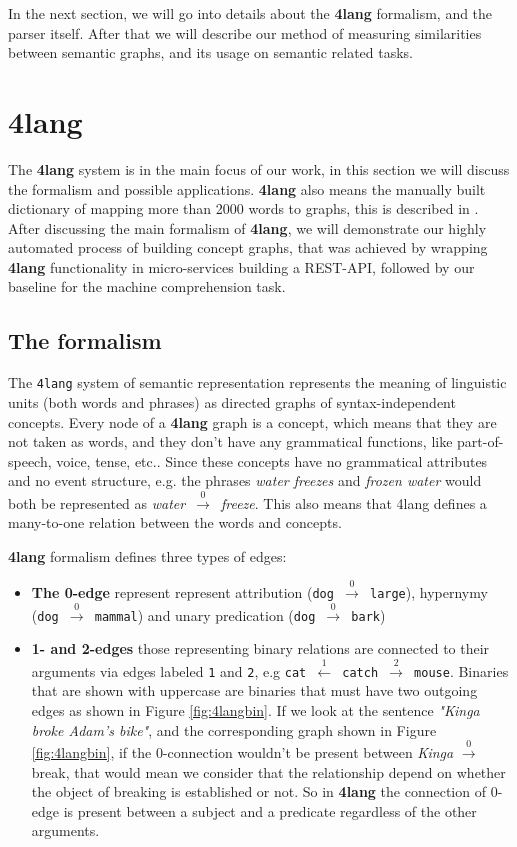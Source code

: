 In the next section, we will go into details about the \textbf{4lang} formalism, and the parser itself. After that we will describe our method of measuring similarities between semantic graphs, and its usage on semantic related tasks.

\section{4lang}
\label{sec:4lang}
The \textbf{4lang} system is in the main focus of our work, in this section we will discuss the formalism and possible applications. \textbf{4lang} also means the manually built dictionary of mapping more than 2000 words to graphs, this is described in \cite{Kornai:2013}. After discussing the main formalism of \textbf{4lang}, we will demonstrate our highly automated process of building concept graphs, that was achieved by wrapping \textbf{4lang} functionality in micro-services building a REST-API, followed by our baseline for the machine comprehension task.

\subsection{The formalism}
The \texttt{4lang} system of semantic representation \cite{Kornai:2015a}
represents the meaning of linguistic units (both words and phrases)
as directed graphs of syntax-independent concepts. Every node of a \textbf{4lang} graph is a concept, which means that they are not taken as words, and they don't have any grammatical functions, like part-of-speech, voice, tense, etc.\cite{Recski:2016}.
Since these concepts have no grammatical attributes and no event structure, e.g.
the phrases \textit{water freezes} and \textit{frozen water} would both be
represented as \textit{water}~$\xrightarrow0$~\textit{freeze}. This also means that 4lang defines a many-to-one relation between the words and concepts. 

\textbf{4lang} formalism defines three types of edges:
\begin{itemize}
	\item \textbf{The 0-edge} represent represent attribution (\texttt{dog
		$\xrightarrow0$ large}), hypernymy (\texttt{dog $\xrightarrow0$ mammal}) and unary predication (\texttt{dog  $\xrightarrow0$ bark})
	\item \textbf{1- and 2-edges} those representing binary relations are connected to their arguments
	via edges labeled \texttt{1} and \texttt{2}, e.g \texttt{cat $\xleftarrow1$ catch $\xrightarrow2$ mouse}. Binaries that are shown with uppercase are binaries that must have two outgoing edges as shown in Figure \ref{fig:4langbin}. If we look at the sentence \textit{"Kinga broke Adam's bike"}, and the corresponding graph shown in Figure \ref{fig:4langbin}, if the 0-connection wouldn't be present between \textit{Kinga} $\xrightarrow0$ break, that would mean we consider that the relationship depend on whether the object of breaking is established or not. So in \textbf{4lang} the connection of 0-edge is present between a subject and a predicate regardless of the other arguments.
\end{itemize}

